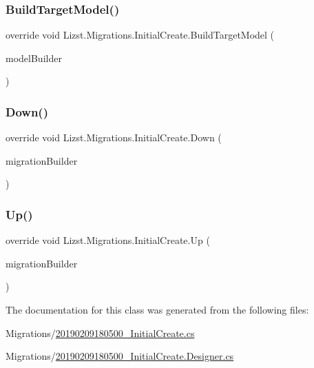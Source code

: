 \subsubsection{\texorpdfstring{BuildTargetModel()}{BuildTargetModel()}}
{\footnotesize\ttfamily override void Lizst.\+Migrations.\+Initial\+Create.\+Build\+Target\+Model (\begin{DoxyParamCaption}\item[{Model\+Builder}]{model\+Builder }\end{DoxyParamCaption})\hspace{0.3cm}{\ttfamily [protected]}}

\mbox{\label{class_lizst_1_1_migrations_1_1_initial_create_a7d7e9d7f04c1bcf0bcee5d1ab070a557}} 
\subsubsection{\texorpdfstring{Down()}{Down()}}
{\footnotesize\ttfamily override void Lizst.\+Migrations.\+Initial\+Create.\+Down (\begin{DoxyParamCaption}\item[{Migration\+Builder}]{migration\+Builder }\end{DoxyParamCaption})\hspace{0.3cm}{\ttfamily [protected]}}

\mbox{\label{class_lizst_1_1_migrations_1_1_initial_create_a71c7c103533bd2359ab1599152a0f951}} 
\subsubsection{\texorpdfstring{Up()}{Up()}}
{\footnotesize\ttfamily override void Lizst.\+Migrations.\+Initial\+Create.\+Up (\begin{DoxyParamCaption}\item[{Migration\+Builder}]{migration\+Builder }\end{DoxyParamCaption})\hspace{0.3cm}{\ttfamily [protected]}}



The documentation for this class was generated from the following files\+:\begin{DoxyCompactItemize}
\item 
Migrations/\mbox{\hyperlink{20190209180500___initial_create_8cs}{20190209180500\+\_\+\+Initial\+Create.\+cs}}\item 
Migrations/\mbox{\hyperlink{20190209180500___initial_create_8_designer_8cs}{20190209180500\+\_\+\+Initial\+Create.\+Designer.\+cs}}\end{DoxyCompactItemize}
